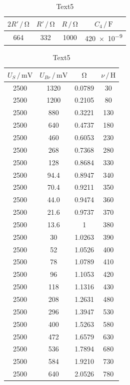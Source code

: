 \begin{table}
\normalsize
\centering
{}
\begin{tabular}{c c c c}
\toprule
        $2R' \,/\,\si{\ohm}$ & $R' \,/\,\si{\ohm}$ & $R \,/\,\si{\ohm}$ & $C_{4} \,/\, \si{\farad}$ \\
        \midrule
        664 & 332 & 1000 & \num{420e-9} \\
\bottomrule
\end{tabular}
\caption{Text5} 
\label{tab:6}
\end{table}

\noindent
\begin{table}
\normalsize
\centering
{}
\begin{tabular}{c c c c}
\toprule
        $U_{S} \,/\,\si{\milli\volt}$ & $U_{Br} \,/\,\si{\milli\volt}$ & $\upOmega$ & $\nu \,/\, \si{\henry}$ \\
        \midrule
        2500 & 1320 &           0.0789 & 30 \\
        2500 & 1200 &           0.2105 & 80 \\
        2500 & 880 &            0.3221 & 130 \\
        2500 & 640 &            0.4737 & 180 \\
        2500 & 460 &            0.6053 & 230 \\
        2500 & 268 &            0.7368 & 280 \\
        2500 & 128 &            0.8684 & 330 \\
        2500 & 94.4 &           0.8947 & 340 \\
        2500 & 70.4 &           0.9211 & 350 \\
        2500 & 44.0 &           0.9474 & 360 \\
        2500 & 21.6 &           0.9737 & 370 \\
        2500 & 13.6 &           1 & 380 \\   
        2500 & 30 &             1.0263 & 390 \\
        2500 & 52 &             1.0526 & 400 \\
        2500 & 78 &             1.0789 & 410 \\
        2500 & 96 &             1.1053 & 420 \\
        2500 & 118 &            1.1316 & 430 \\
        2500 & 208 &            1.2631 & 480 \\
        2500 & 296 &            1.3947 & 530 \\
        2500 & 400 &            1.5263 & 580 \\
        2500 & 472 &            1.6579 & 630 \\
        2500 & 536 &            1.7894 & 680 \\
        2500 & 584 &            1.9210 & 730 \\
        2500 & 640 &            2.0526 & 780 \\
        
\bottomrule
\end{tabular}
\caption{Text5} 
\label{tab:7}
\end{table}





